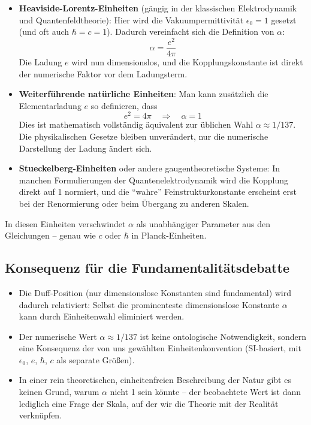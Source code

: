 \begin{itemize}
	\item \textbf{Heaviside-Lorentz-Einheiten} (gängig in der klassischen Elektrodynamik und Quantenfeldtheorie):  
	Hier wird die Vakuumpermittivität \(\epsilon_0 = 1\) gesetzt (und oft auch \(\hbar = c = 1\)). Dadurch vereinfacht sich die Definition von \(\alpha\):
	\[
	\alpha = \frac{e^2}{4\pi}
	\]
	Die Ladung \(e\) wird nun dimensionslos, und die Kopplungskonstante ist direkt der numerische Faktor vor dem Ladungsterm.
	
	\item \textbf{Weiterführende natürliche Einheiten}:  
	Man kann zusätzlich die Elementarladung \(e\) so definieren, dass
	\[
	e^2 = 4\pi \quad \Rightarrow \quad \alpha = 1
	\]
	Dies ist mathematisch vollständig äquivalent zur üblichen Wahl \(\alpha \approx 1/137\). Die physikalischen Gesetze bleiben unverändert, nur die numerische Darstellung der Ladung ändert sich.
	
	\item \textbf{Stueckelberg-Einheiten} oder andere gaugentheoretische Systeme:  
	In manchen Formulierungen der Quantenelektrodynamik wird die Kopplung direkt auf 1 normiert, und die ``wahre'' Feinstrukturkonstante erscheint erst bei der Renormierung oder beim Übergang zu anderen Skalen.
\end{itemize}

In diesen Einheiten verschwindet \(\alpha\) als unabhängiger Parameter aus den Gleichungen – genau wie \(c\) oder \(\hbar\) in Planck-Einheiten.

\subsection{Konsequenz für die Fundamentalitätsdebatte}

\begin{itemize}
	\item Die Duff-Position (nur dimensionslose Konstanten sind fundamental) wird dadurch relativiert: Selbst die prominenteste dimensionslose Konstante \(\alpha\) kann durch Einheitenwahl eliminiert werden.
	\item Der numerische Wert \(\alpha \approx 1/137\) ist keine ontologische Notwendigkeit, sondern eine Konsequenz der von uns gewählten Einheitenkonvention (SI-basiert, mit \(\epsilon_0\), \(e\), \(\hbar\), \(c\) als separate Größen).
	\item In einer rein theoretischen, einheitenfreien Beschreibung der Natur gibt es keinen Grund, warum \(\alpha\) nicht 1 sein könnte – der beobachtete Wert ist dann lediglich eine Frage der Skala, auf der wir die Theorie mit der Realität verknüpfen.
\end{itemize}

